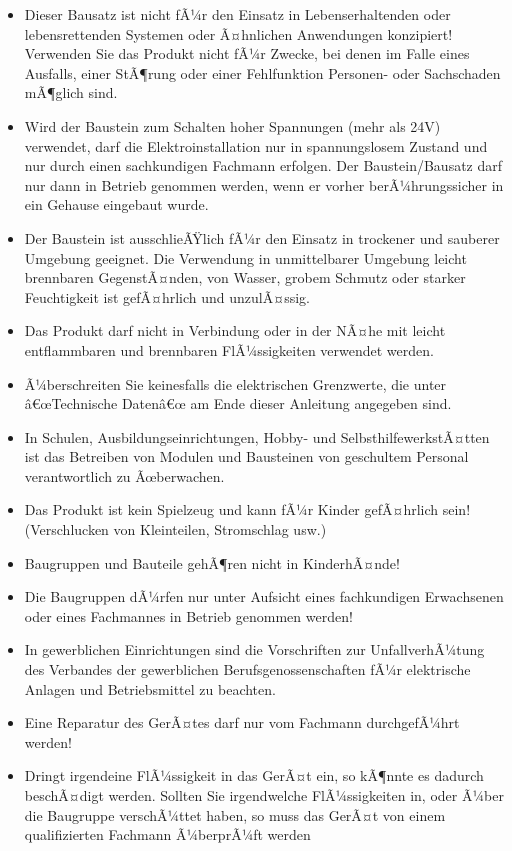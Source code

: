 \documentclass[fleqn,10pt]{SelfArx} %
\begin{document}
\begin{itemize}[noitemsep] %
\item Dieser Bausatz ist nicht fÃ¼r den Einsatz in Lebenserhaltenden oder lebensrettenden Systemen oder Ã¤hnlichen Anwendungen konzipiert! Verwenden Sie das Produkt nicht fÃ¼r Zwecke, bei denen im Falle eines Ausfalls, einer StÃ¶rung oder einer Fehlfunktion Personen- oder Sachschaden mÃ¶glich sind.
\item Wird der Baustein zum Schalten hoher Spannungen (mehr als 24V) verwendet, darf die Elektroinstallation nur in spannungslosem Zustand
und nur durch einen sachkundigen Fachmann erfolgen. Der Baustein/Bausatz darf nur dann in Betrieb genommen werden, wenn er vorher berÃ¼hrungssicher in ein Gehause eingebaut wurde.
\item Der Baustein ist ausschlieÃŸlich fÃ¼r den Einsatz in trockener und sauberer Umgebung geeignet. Die Verwendung in unmittelbarer Umgebung leicht brennbaren GegenstÃ¤nden, von Wasser, grobem Schmutz oder starker Feuchtigkeit ist gefÃ¤hrlich und unzulÃ¤ssig.
\item Das Produkt darf nicht in Verbindung oder in der NÃ¤he mit leicht entflammbaren und brennbaren FlÃ¼ssigkeiten verwendet werden.
\item Ã¼berschreiten Sie keinesfalls die elektrischen Grenzwerte, die unter â€œTechnische Datenâ€œ am Ende dieser Anleitung angegeben sind.
\item In Schulen, Ausbildungseinrichtungen, Hobby- und SelbsthilfewerkstÃ¤tten ist das Betreiben von Modulen und Bausteinen von geschultem Personal verantwortlich zu Ãœberwachen.
\item Das Produkt ist kein Spielzeug und kann fÃ¼r Kinder gefÃ¤hrlich sein! (Verschlucken von Kleinteilen, Stromschlag usw.)
\item Baugruppen und Bauteile gehÃ¶ren nicht in KinderhÃ¤nde!
\item Die Baugruppen dÃ¼rfen nur unter Aufsicht eines fachkundigen Erwachsenen oder eines Fachmannes in Betrieb genommen werden!
\item In gewerblichen Einrichtungen sind die Vorschriften zur UnfallverhÃ¼tung des Verbandes der gewerblichen Berufsgenossenschaften fÃ¼r elektrische Anlagen und Betriebsmittel zu beachten.
\item Eine Reparatur des GerÃ¤tes darf nur vom Fachmann durchgefÃ¼hrt werden!
\item Dringt irgendeine FlÃ¼ssigkeit in das GerÃ¤t ein, so kÃ¶nnte es dadurch beschÃ¤digt werden. Sollten Sie irgendwelche FlÃ¼ssigkeiten in, oder Ã¼ber die Baugruppe verschÃ¼ttet haben, so muss das GerÃ¤t von einem qualifizierten Fachmann Ã¼berprÃ¼ft werden

\end{itemize}
\end{document}
